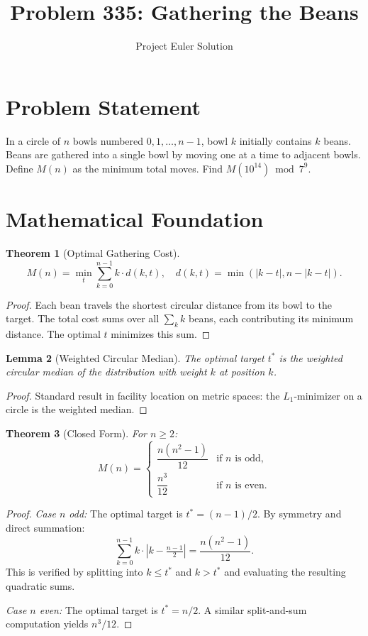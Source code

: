 \documentclass[12pt]{article}
\title{Problem 335: Gathering the Beans}
\author{Project Euler Solution}
\date{}
\newtheorem{theorem}{Theorem}
\newtheorem{lemma}[theorem]{Lemma}
\begin{document}
\maketitle

\section{Problem Statement}

In a circle of $n$ bowls numbered $0, 1, \ldots, n-1$, bowl $k$ initially contains $k$ beans. Beans are gathered into a single bowl by moving one at a time to adjacent bowls. Define $M(n)$ as the minimum total moves. Find $M(10^{14}) \bmod 7^9$.

\section{Mathematical Foundation}

\begin{theorem}[Optimal Gathering Cost]
\[
M(n) = \min_{t} \sum_{k=0}^{n-1} k \cdot d(k, t), \quad d(k,t) = \min(|k-t|, n - |k-t|).
\]
\end{theorem}

\begin{proof}
Each bean travels the shortest circular distance from its bowl to the target. The total cost sums over all $\sum_k k$ beans, each contributing its minimum distance. The optimal $t$ minimizes this sum.
\end{proof}

\begin{lemma}[Weighted Circular Median]
The optimal target $t^*$ is the weighted circular median of the distribution with weight $k$ at position $k$.
\end{lemma}

\begin{proof}
Standard result in facility location on metric spaces: the $L_1$-minimizer on a circle is the weighted median.
\end{proof}

\begin{theorem}[Closed Form]
For $n \ge 2$:
\[
M(n) = \begin{cases}
\dfrac{n(n^2-1)}{12} & \text{if } n \text{ is odd}, \\[6pt]
\dfrac{n^3}{12} & \text{if } n \text{ is even}.
\end{cases}
\]
\end{theorem}

\begin{proof}
\emph{Case $n$ odd:} The optimal target is $t^* = (n-1)/2$. By symmetry and direct summation:
\[
\sum_{k=0}^{n-1} k \cdot \left|k - \tfrac{n-1}{2}\right| = \frac{n(n^2-1)}{12}.
\]
This is verified by splitting into $k \le t^*$ and $k > t^*$ and evaluating the resulting quadratic sums.

\emph{Case $n$ even:} The optimal target is $t^* = n/2$. A similar split-and-sum computation yields $n^3/12$.
\end{proof}
\end{document}
